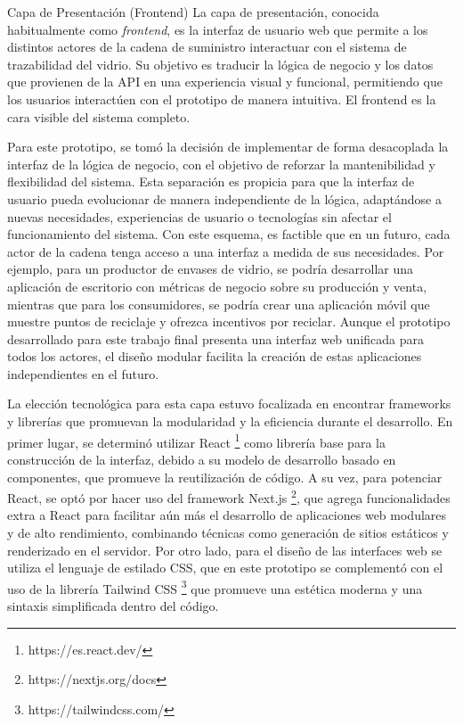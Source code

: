 Capa de Presentación (Frontend)
La capa de presentación, conocida habitualmente como \textit{frontend}, es la interfaz de usuario web que permite a los distintos actores de la cadena de suministro interactuar con el sistema de trazabilidad del vidrio. Su objetivo es traducir la lógica de negocio y los datos que provienen de la API en una experiencia visual y funcional, permitiendo que los usuarios interactúen con el prototipo de manera intuitiva. El frontend es la cara visible del sistema completo.

Para este prototipo, se tomó la decisión de implementar de forma desacoplada la interfaz de la lógica de negocio, con el objetivo de reforzar la mantenibilidad y flexibilidad del sistema. Esta separación es propicia para que la interfaz de usuario pueda evolucionar de manera independiente de la lógica, adaptándose a nuevas necesidades, experiencias de usuario o tecnologías sin afectar el funcionamiento del sistema. Con este esquema, es factible que en un futuro, cada actor de la cadena tenga acceso a una interfaz a medida de sus necesidades. Por ejemplo, para un productor de envases de vidrio, se podría desarrollar una aplicación de escritorio con métricas de negocio sobre su producción y venta, mientras que para los consumidores, se podría crear una aplicación móvil que muestre puntos de reciclaje y ofrezca incentivos por reciclar. Aunque el prototipo desarrollado para este trabajo final presenta una interfaz web unificada para todos los actores, el diseño modular facilita la creación de estas aplicaciones independientes en el futuro.

La elección tecnológica para esta capa estuvo focalizada en encontrar frameworks y librerías que promuevan la modularidad y la eficiencia durante el desarrollo. En primer lugar, se determinó utilizar React \footnote{https://es.react.dev/} como librería base para la construcción de la interfaz, debido a su modelo de desarrollo basado en componentes, que promueve la reutilización de código. A su vez, para potenciar React, se optó por hacer uso del framework Next.js \footnote{https://nextjs.org/docs}, que agrega funcionalidades extra a React para facilitar aún más el desarrollo de aplicaciones web modulares y de alto rendimiento, combinando técnicas como generación de sitios estáticos y renderizado en el servidor. Por otro lado, para el diseño de las interfaces web se utiliza el lenguaje de estilado CSS, que en este prototipo se complementó con el uso de la librería Tailwind CSS \footnote{https://tailwindcss.com/} que promueve una estética moderna y una sintaxis simplificada dentro del código.

